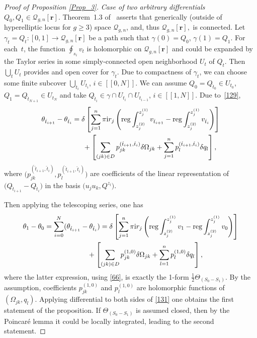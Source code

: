 \documentclass[pdftex]{sigma}
\numberwithin{equation}{section}
\theoremstyle{definition}
\begin{document}
\begin{proof}[Proof of Proposition \ref{Prop_3}]
\textit{Case of two arbitrary differentials} $Q_0, Q_1 \in \mathcal{Q}_{g,n}[\mathbf{r}] $.
Theorem~1.3 of~\cite{chen2021classification} asserts that generically (outside of hyperelliptic locus for $g \geq 3$) space $\mathcal{Q}_{g,n}$, and, thus $\mathcal{Q}_{g,n}[\mathbf{r}],$ is connected. Let $\gamma_t=Q_t\colon [0,1] \xrightarrow{} \mathcal{Q}_{g,n}[\mathbf{r}] $ be a path such that $\gamma(0)=Q_0$, $\gamma(1)=Q_1.$ For each~$t$, the function $\oint_{s_i} v_t$ is holomorphic on $\mathcal{Q}_{g,n}[\mathbf{r}]$ and could be expanded by the Taylor series in some simply-connected open neighborhood $U_t$ of $Q_t$. Then $\bigcup_t U_t$ provides and open cover for $\gamma_t$. Due to compactness of $\gamma_t$, we can choose some finite subcover $\bigcup_{t_i} U_{t_i}$, $i \in [[0,N]].$ We can assume $Q_0=Q_{\hat{t}_0} \in U_{t_0}$, $Q_1=Q_{\hat{t}_{N+1}} \in U_{t_N}$ and take $Q_{\hat{t}_i} \in \gamma \cap U_{t_{i}} \cap U_{t_{i-1}}$, $i \in [[1,N]]$.
Due to~\eqref{129},
\begin{gather*}%
\theta_{\hat{t}_{i+1}}-\theta_{\hat{t}_i}= \delta \left[\sum^n_{j=1} \pi {\rm i} r_j \left({\rm reg}\int^{z^{(1)}_j}_{z^{(2)}_j}{v_{\hat{t}_{i+1}}}-{\rm reg}\int^{z^{(1)}_j}_{z^{(2)}_j}{v_{\hat{t}_i}} \right) \right]\\
\hphantom{\theta_{\hat{t}_{i+1}}-\theta_{\hat{t}_i}=}{}
+\left[\sum_{(jk) \in D}p^{(\hat{t}_{i+1}, \hat{t}_i)}_{jk} \delta \Omega_{jk}+\sum^n_{j=1}p^{(\hat{t}_{i+1}, \hat{t}_i)}_l \delta q_l \right],
\end{gather*}
where $\big(p^{(\hat{t}_{i+1}, \hat{t}_i)}_{jk}, p^{(\hat{t}_{i+1}, \hat{t}_i)}_l\big)$ are coefficients of the linear representation of $\big(Q_{\hat{t}_{i+1}}-Q_{\hat{t}_{i}}\big)$ in the basis $\big(u_j u_k, Q^{z_l}\big)$.

Then applying the telescoping series, one has
\begin{gather}\theta_{1}-\theta_{0}=\sum^{N}_{i=0}(\theta_{\hat{t}_{i+1}}-\theta_{\hat{t}_i})= \delta \left[\sum^n_{j=1} \pi{\rm i} r_j \left({\rm reg}\int^{z^{(1)}_j}_{z^{(2)}_j}v_1-{\rm reg}\int^{z^{(1)}_j}_{z^{(2)}_j} v_0 \right) \right]\nonumber\\
\hphantom{\theta_{1}-\theta_{0}=}{}
+\left[\sum_{(jk) \in D}p^{(1,0)}_{jk} \delta \Omega_{jk}+\sum^n_{l=1}p^{(1,0)}_l \delta q_l\right],\label{131}
\end{gather}
where the latter expression, using \eqref{66}, is exactly the 1-form $\frac{1}{2}\Theta_{(S_0-S_1)}.$ By the assumption, coefficients $p^{(1,0)}_{jk}$ and $p^{(1,0)}_l$ are holomorphic functions of $(\Omega_{jk},q_l)$.
Applying differential to both sides of \eqref{131} one obtains the first statement of the proposition. If $\Theta_{(S_0 -S_1)}$ is assumed closed, then by the Poincar\'e lemma it could be locally integrated, leading to the second statement.
\end{proof}
\end{document}
